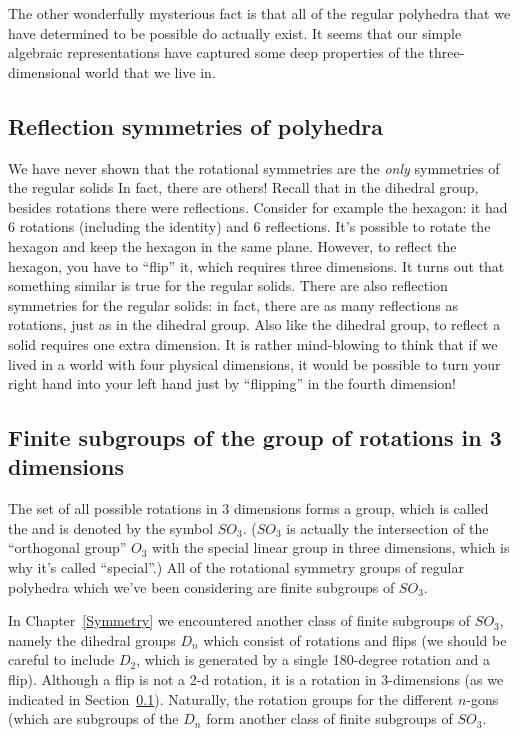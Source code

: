 The other wonderfully mysterious fact is that all of the regular polyhedra that we have determined to be possible do actually exist. It seems that our simple algebraic representations  have captured some deep properties of the three-dimensional world that we live in.

\subsection{Reflection symmetries of polyhedra}
\label{subsec:GroupActions:SymmetryOfPolyhedra:reflSym}

We have never shown that the rotational symmetries are the \emph{only}  symmetries of the regular solids In fact, there are others! Recall that in the dihedral group, besides rotations there were reflections. Consider for example the hexagon: it had 6 rotations (including the identity) and 6 reflections. It's possible to rotate the hexagon and keep the hexagon in the same plane. However, to reflect the hexagon, you have to ``flip'' it, which requires three dimensions.  It turns out that something similar is true for the regular solids. There are also reflection symmetries for the regular solids: in fact, there are as many reflections as rotations, just as in the dihedral group. Also like the dihedral group, to reflect a solid requires one extra dimension. It is rather mind-blowing to think that if we lived in a world with four physical dimensions, it would be possible to turn your right hand into your left hand just by ``flipping'' in the fourth dimension!

\subsection{Finite subgroups of the group of rotations in 3 dimensions}
\label{subsec:GroupActions:SymmetryOfPolyhedra:FiniteGroupRotation3D}

The set of all possible rotations in 3 dimensions forms a group, which is called the  and is denoted by the symbol $SO_3$. ($SO_3$ is actually the intersection of the ``orthogonal group'' $O_3$ with the special linear group in three dimensions, which is why it's called ``special''.)  All of  the rotational symmetry groups of regular polyhedra which we've been considering are finite subgroups of  $SO_3$. 

In Chapter~\ref{Symmetry} we encountered another class of finite subgroups of $SO_3$, namely the dihedral groups $D_n$ which consist of rotations and flips (we should be careful to include $D_2$, which is generated by  a single 180-degree rotation and a flip). Although a flip is not a 2-d rotation, it is a rotation in 3-dimensions (as we indicated in  Section~\ref{subsec:GroupActions:SymmetryOfPolyhedra:reflSym}). Naturally, the rotation groups for the different $n$-gons (which are subgroups of the $D_n$ form another class of finite subgroups of $SO_3$.

